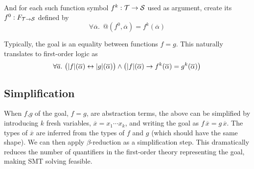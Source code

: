 And for each such function symbol $f^k:\mathcal{T}\to\mathcal{S}$ used as argument, create its 
 $f^0:F_{\mathcal{T}\to\mathcal{S}}$ defined by
\begin{equation}
\forall \overline\alpha.~~@(f^0,\overline\alpha)=f^k(\overline\alpha)
\label{automated:reflection}
\end{equation}

Typically, the goal is an equality between functions $f=g$. This naturally translates
to first-order logic as
\[\forall\overline{a}.~\big(|f|(\overline\alpha)\leftrightarrow|g|(\overline\alpha)\big) \land
  \big(|f|(\overline\alpha) \rightarrow f^k(\overline\alpha)=g^k(\overline\alpha)\big)\]
  
\subsection{Simplification}

When $f$,$g$ of the goal, $f=g$, are abstraction terms, the above can be simplified by
introducing $k$ fresh variables, $\overline x=x_1\cdots x_k$, and writing the goal as
$f\,\overline x = g\,\overline x$. The types of $\overline x$ are inferred from the types
of $f$ and $g$ (which should have the same shape). We can then apply $\beta$-reduction as
a simplification step. This dramatically reduces the number of quantifiers in the first-order
theory representing the goal, making SMT solving feasible.

